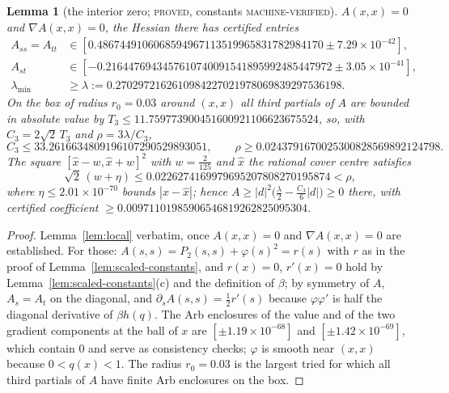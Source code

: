 \documentclass[11pt]{article}
\theoremstyle{plain}
\newtheorem{lemma}[theorem]{Lemma}
\theoremstyle{definition}
\theoremstyle{remark}
\newcommand{\lbl}[1]{\textsc{#1}}
\begin{document}
\begin{lemma}[the interior zero; \lbl{proved}, constants \lbl{machine-verified}]\label{lem:scaled-local}
$A(x,x)=0$ and $\nabla A(x,x)=0$, the Hessian there has certified entries
\begin{align*}
A_{ss}=A_{tt}&\in[0.4867449106068594967113519965831782984170\pm7.29\times10^{-42}],\\
A_{st}&\in[-0.2164476943457610740091541895992485447972\pm3.05\times10^{-41}],\\
\lambda_{\min}&\ge\lambda:=0.2702972162610984227021978069839297536198 .
\end{align*}
On the box of
radius $r_0=0.03$ around $(x,x)$ all third partials of $A$ are bounded in
absolute value by $T_3\le11.759773900451600921106623675524$, so, with
$C_3=2\sqrt2\,T_3$ and $\rho=3\lambda/C_3$,
\[
  C_3\le33.2616634809196107290529893051,\qquad
  \rho\ge0.0243791670025300828569892124798 .
\]
The square
$[\hat x-w,\hat x+w]^2$ with $w=\tfrac2{125}$ and $\hat x$ the rational cover
centre satisfies
\[
  \sqrt2\,(w+\eta)\le0.0226274169979695207808270195874<\rho,
\]
where $\eta\le2.01\times10^{-70}$ bounds $|x-\hat x|$; hence
$A\ge|d|^2\bigl(\tfrac\lambda2-\tfrac{C_3}6|d|\bigr)\ge0$ there, with
certified coefficient $\ge0.00971101985906546819262825095304$.
\end{lemma}
\begin{proof}
Lemma~\ref{lem:local} verbatim, once $A(x,x)=0$ and $\nabla A(x,x)=0$ are
established.  For those: $A(s,s)=P_2(s,s)+\varphi(s)^2=r(s)$ with $r$ as in
the proof of Lemma~\ref{lem:scaled-constants}, and $r(x)=0$,
$r'(x)=0$ hold by Lemma~\ref{lem:scaled-constants}(c) and the definition of
$\beta$; by symmetry of $A$, $A_s=A_t$ on the diagonal, and
$\partial_sA(s,s)=\tfrac12r'(s)$ because $\varphi\varphi'$ is half the
diagonal derivative of $\beta h(q)$.  The Arb enclosures of the value and of
the two gradient components at the ball of $x$ are
$[\pm1.19\times10^{-68}]$ and $[\pm1.42\times10^{-69}]$, which contain $0$
and serve as consistency checks; $\varphi$ is smooth near $(x,x)$ because
$0<q(x)<1$.  The radius $r_0=0.03$ is the largest tried for which all third
partials of $A$ have finite Arb enclosures on the box.
\end{proof}
\end{document}

